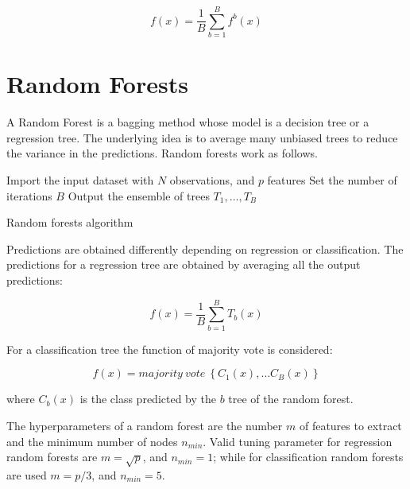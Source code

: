 \begin{equation}
f\left(x\right)=\frac{1}{B}\sum_{b=1}^{B}{f^b(x)}
\label{eq_bagging}
\end{equation}

\section{Random Forests}
A Random Forest is a bagging method whose model is a decision tree or a regression tree. The underlying idea is to average many unbiased trees to reduce the variance in the predictions. Random forests work as follows.

\begin{algorithm}[H]
\DontPrintSemicolon
\SetAlgoLined
Import the input dataset with $N$ observations, and $p$ features\;
Set the number of iterations $B$\;
Output the ensemble of trees ${T_1,\ldots,T_B}$\;

\caption{Random forests algorithm}
\label{algo_randomForest}
\end{algorithm}

Predictions are obtained differently depending on regression or classification. The predictions for a regression tree are obtained by averaging all the output predictions:

\begin{equation}
f\left(x\right)=\frac{1}{B}\sum_{b=1}^{B}{T_b\left(x\right)}
\label{eq_randomRegression}
\end{equation}

For a classification tree the function of majority vote is considered:

\begin{equation}
 f\left(x\right)=majority\ vote\ \left\{C_1\left(x\right),\ldots C_B(x)\right\} 
\label{eq_randomClassification}
\end{equation}

where $C_b(x)$ is the class predicted by the $b$ tree of the random forest.\par

The hyperparameters of a random forest are the number $m$ of features to extract and the minimum number of nodes $n_{min}$. Valid tuning parameter for regression random forests are $m=\sqrt p$, and $n_{min}=1$; while for classification random forests are used $m=p/3$, and $n_{min}=5$.\par

